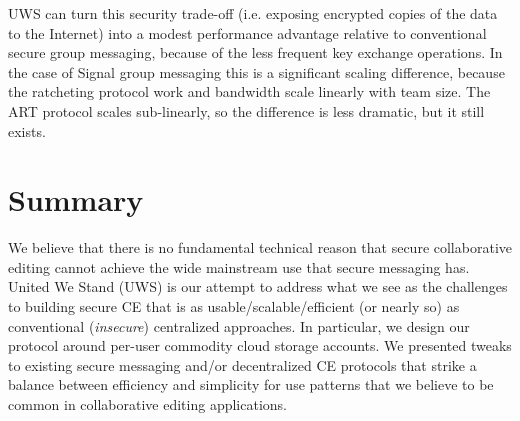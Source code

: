 \documentclass[runningheads]{llncs}
\begin{document}
UWS can turn this security trade-off (i.e. exposing encrypted copies of the data to the Internet) into a modest performance advantage relative to conventional secure group messaging, because of the less frequent key exchange operations.
In the case of Signal group messaging this is a significant scaling difference, because the ratcheting protocol work and bandwidth scale linearly with team size.
The ART protocol scales sub-linearly, so the difference is less dramatic, but it still exists.

\section{Summary}

We believe that there is no fundamental technical reason that secure collaborative editing cannot achieve the wide mainstream use that secure messaging has.
United We Stand (UWS) is our attempt to address what we see as the challenges to building secure CE that is as usable{\slash}scalable{\slash}efficient (or nearly so) as conventional (\emph{insecure}) centralized approaches.
In particular, we design our protocol around per-user commodity cloud storage accounts.
We presented tweaks to existing secure messaging and{\slash}or decentralized CE protocols that strike a balance between efficiency and simplicity for use patterns that we believe to be common in collaborative editing applications.



\end{document}
